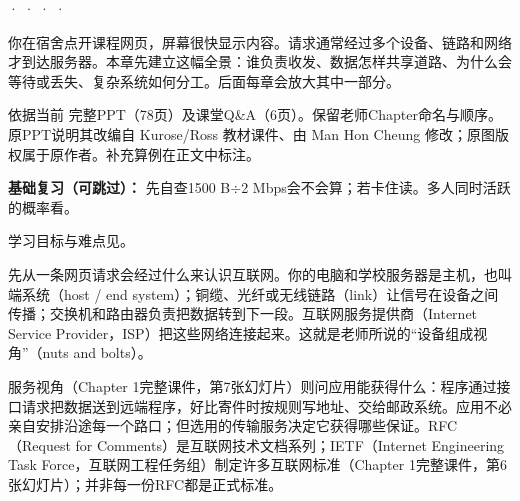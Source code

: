


 ·  ·  ·  · 


你在宿舍点开课程网页，屏幕很快显示内容。请求通常经过多个设备、链路和网络才到达服务器。本章先建立这幅全景：谁负责收发、数据怎样共享道路、为什么会等待或丢失、复杂系统如何分工。后面每章会放大其中一部分。


依据当前 完整PPT（78页）及课堂Q\&A（6页）。保留老师Chapter命名与顺序。原PPT说明其改编自 Kurose/Ross 教材课件、由 Man Hon Cheung 修改；原图版权属于原作者。补充算例在正文中标注。


\textbf{基础复习（可跳过）：} 先自查1500 B\ensuremath{\div}2 Mbps会不会算；若卡住读。多人同时活跃的概率看。



学习目标与难点见。





先从一条网页请求会经过什么来认识互联网。你的电脑和学校服务器是主机，也叫端系统（host / end system）；铜缆、光纤或无线链路（link）让信号在设备之间传播；交换机和路由器负责把数据转到下一段。互联网服务提供商（Internet Service Provider，ISP）把这些网络连接起来。这就是老师所说的“设备组成视角”（nuts and bolts）。






服务视角（Chapter 1完整课件，第7张幻灯片）则问应用能获得什么：程序通过接口请求把数据送到远端程序，好比寄件时按规则写地址、交给邮政系统。应用不必亲自安排沿途每一个路口；但选用的传输服务决定它获得哪些保证。RFC（Request for Comments）是互联网技术文档系列；IETF（Internet Engineering Task Force，互联网工程任务组）制定许多互联网标准（Chapter 1完整课件，第6张幻灯片）；并非每一份RFC都是正式标准。



